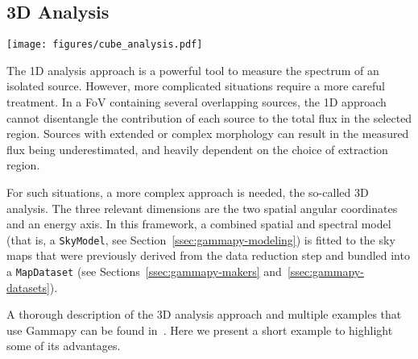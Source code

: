 \documentclass[longauth]{aa}
\newcommand{\code}[1]{\texttt{#1}}
\newcommand{\gammapy}{Gammapy\xspace}
\newcommand{\cta}{CTA\xspace}
\newcommand{\irfs}{IRFs\xspace}
\begin{document}
\subsection{3D Analysis}
\label{ssec:3d-analysis}
%
\begin{figure*}[t]
        \centering
        \texttt{[image: figures/cube\_analysis.pdf]}
        \caption{Example of a 3D analysis for simulated sources with point-like, Gaussian
                and shell-like morphologies. The simulation uses \enquote{prod5} \irfs from \cta
                \citep{CtaProd5}.
                The left image shows a significance map (using the \emph{Cash} statistics)
                where the three simulated sources can be seen. The middle figure shows another significance map,
                but this time after
                subtracting the best-fit model for each of the sources, which are displayed in
                black. The right figure shows the contribution of each source model to the
                circular region of radius 0.5\textdegree~drawn in the left image, together with
                the excess counts inside that region. }
        \label{fig:cube_analysis}
\end{figure*}
%
The 1D analysis approach is a powerful tool to measure the spectrum of an
isolated source. However, more complicated situations require a more careful
treatment. In a FoV containing several overlapping sources, the 1D
approach cannot disentangle the contribution of each source to the total flux in
the selected region. Sources with extended or complex morphology can result in
the measured flux being underestimated, and heavily dependent on the choice of
extraction region.

For such situations, a more complex approach is needed, the so-called 3D
analysis. The three relevant dimensions are the two spatial angular coordinates
and an energy axis. In this framework, a combined spatial and spectral model
(that is, a \code{SkyModel}, see Section~\ref{ssec:gammapy-modeling}) is fitted to the
sky maps that were previously derived from the data reduction step and bundled into a
\code{MapDataset} (see Sections~\ref{ssec:gammapy-makers} and~\ref{ssec:gammapy-datasets}).

A thorough description of the 3D analysis approach and multiple examples that
use \gammapy can be found in~\cite{Mohrmann2019}. Here we present a short
example to highlight some of its advantages.
\end{document}
